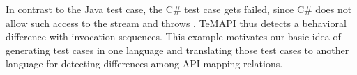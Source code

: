 In contrast to the Java test case, the C\# test case gets failed, since C\# does not allow such access to the stream and throws . TeMAPI thus detects a behavioral difference with invocation sequences. This example motivates our basic idea of generating test cases in one language and translating those test cases to another language for detecting differences among API mapping relations. %


